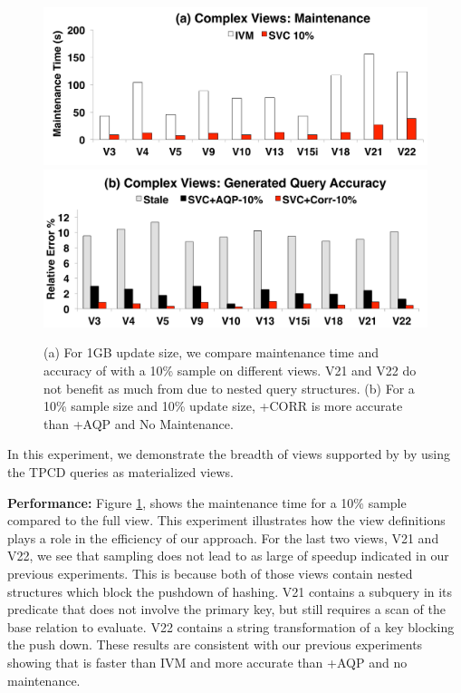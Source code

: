 \begin{figure}[t]
\centering
 \includegraphics[scale=0.14]{exp/msqv_1.pdf}\vspace{.5em}
 \includegraphics[scale=0.14]{exp/msqv_2.pdf} %
 \caption{(a) For 1GB update size, we compare maintenance time and accuracy of \svc with a 10\% sample on different views. V21 and V22 do not benefit as much from \svc due to nested query structures. (b) For a 10\% sample size and 10\% update size, \svcnospace+CORR is more accurate than \svcnospace+AQP and No Maintenance.  \label{exp3-acc}}
\end{figure}
In this experiment, we demonstrate the breadth of views supported by \svc by using the TPCD queries as materialized views.

\textbf{Performance: }
Figure \ref{exp3-acc}, shows the maintenance time for a 10\% sample compared to the full view.
This experiment illustrates how the view definitions plays a role in the efficiency of our approach.
For the last two views, V21 and V22, we see that sampling does not lead to as large of speedup indicated in our previous experiments.  
This is because both of those views contain nested structures which block the pushdown of hashing.
V21 contains a subquery in its predicate that does not involve the primary key, but still requires a scan of the base relation to evaluate.
V22 contains a string transformation of a key blocking the push down.
These results are consistent with our previous experiments showing that \svc is faster than IVM and more accurate than \svcnospace+AQP and no maintenance.


